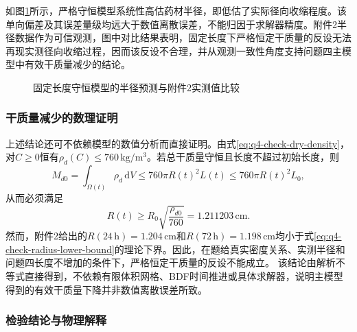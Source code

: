 \documentclass[withoutpreface,bwprint]{cumcmthesis}
\begin{document}
如图\ref{fig:q4-radius-validation}所示，严格守恒模型系统性高估药材半径，即低估了实际径向收缩程度。该单向偏差及其误差量级均远大于数值离散误差，不能归因于求解器精度。附件2半径数据作为可信观测，图中对比结果表明，固定长度下严格恒定干质量的反设无法再现实测径向收缩过程，因而该反设不合理，并从观测一致性角度支持问题四主模型中有效干质量减少的结论。

\begin{figure}[H]
\centering

\caption{固定长度守恒模型的半径预测与附件2实测值比较}
\label{fig:q4-radius-validation}
\end{figure}

\subsubsection{干质量减少的数理证明}

上述结论还可不依赖模型的数值分析而直接证明。由式\eqref{eq:q4-check-dry-density}，对$C\ge0$恒有$\rho_d(C)\le760\,\mathrm{kg/m^3}$。若总干质量守恒且长度不超过初始长度，则
\begin{equation}
M_{d0}=\int_{\Omega(t)}\rho_d\,\mathrm dV
\le760\pi R(t)^2L(t)
\le760\pi R(t)^2L_0,
\end{equation}
从而必须满足
\begin{equation}
\boxed{
R(t)\ge R_0\sqrt{\frac{\rho_{d0}}{760}}
=1.211203\,\mathrm{cm}.
}
\label{eq:q4-check-radius-lower-bound}
\end{equation}
然而，附件2给出的$R(24\,\mathrm h)=1.204\,\mathrm{cm}$和$R(72\,\mathrm h)=1.198\,\mathrm{cm}$均小于式\eqref{eq:q4-check-radius-lower-bound}的理论下界。因此，在题给真实密度关系、实测半径和问题四长度不增加的条件下，严格恒定干质量的反设不能成立。
该结论由解析不等式直接得到，不依赖有限体积网格、BDF时间推进或具体求解器，说明主模型得到的有效干质量下降并非数值离散误差所致。


\subsubsection{检验结论与物理解释}
\end{document}
